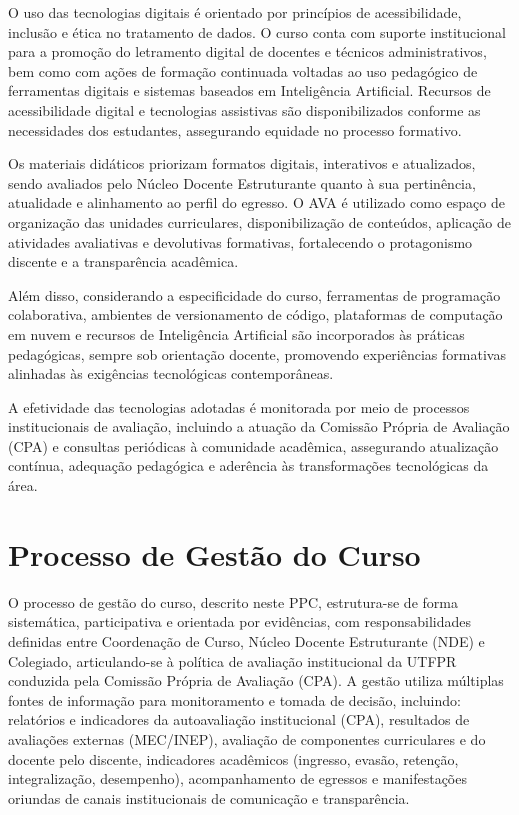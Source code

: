O uso das tecnologias digitais é orientado por princípios de acessibilidade, inclusão e ética no tratamento de dados. O curso conta com suporte institucional para a promoção do letramento digital de docentes e técnicos administrativos, bem como com ações de formação continuada voltadas ao uso pedagógico de ferramentas digitais e sistemas baseados em Inteligência Artificial. Recursos de acessibilidade digital e tecnologias assistivas são disponibilizados conforme as necessidades dos estudantes, assegurando equidade no processo formativo.

Os materiais didáticos priorizam formatos digitais, interativos e atualizados, sendo avaliados pelo Núcleo Docente Estruturante quanto à sua pertinência, atualidade e alinhamento ao perfil do egresso. O AVA é utilizado como espaço de organização das unidades curriculares, disponibilização de conteúdos, aplicação de atividades avaliativas e devolutivas formativas, fortalecendo o protagonismo discente e a transparência acadêmica.

Além disso, considerando a especificidade do curso, ferramentas de programação colaborativa, ambientes de versionamento de código, plataformas de computação em nuvem e recursos de Inteligência Artificial são incorporados às práticas pedagógicas, sempre sob orientação docente, promovendo experiências formativas alinhadas às exigências tecnológicas contemporâneas.

A efetividade das tecnologias adotadas é monitorada por meio de processos institucionais de avaliação, incluindo a atuação da Comissão Própria de Avaliação (CPA) e consultas periódicas à comunidade acadêmica, assegurando atualização contínua, adequação pedagógica e aderência às transformações tecnológicas da área.

\section{Processo de Gestão do Curso}

O processo de gestão do curso, descrito neste PPC, estrutura-se de forma sistemática, participativa e orientada por evidências, com responsabilidades definidas entre Coordenação de Curso, Núcleo Docente Estruturante (NDE) e Colegiado, articulando-se à política de avaliação institucional da UTFPR conduzida pela Comissão Própria de Avaliação (CPA). A gestão utiliza múltiplas fontes de informação para monitoramento e tomada de decisão, incluindo: relatórios e indicadores da autoavaliação institucional (CPA), resultados de avaliações externas (MEC/INEP), avaliação de componentes curriculares e do docente pelo discente, indicadores acadêmicos (ingresso, evasão, retenção, integralização, desempenho), acompanhamento de egressos e manifestações oriundas de canais institucionais de comunicação e transparência.

